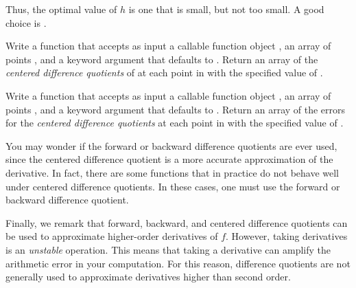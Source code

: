 Thus, the optimal value of $h$ is one that is small, but not too small. A good choice is .

\begin{problem}
Write a function that accepts as input a callable function object , an array of points , and
a keyword argument  that defaults to . 
Return an array of the \emph{centered difference quotients} of  at each point in  with the specified value of .
\end{problem}
\begin{problem}
Write a function that accepts as input a callable function object , an array of points , and
a keyword argument  that defaults to .  Return an array of the errors for the \emph{centered difference quotients} at each point in  with the specified value of .
\end{problem}

You may wonder if the forward or backward difference quotients are ever used, since the centered difference quotient is a more accurate approximation of the derivative.
In fact, there are some functions that in practice do not behave well under centered difference quotients.
In these cases, one must use the forward or backward difference quotient.


Finally, we remark that forward, backward, and centered difference quotients can be used to approximate higher-order derivatives of $f$.
However, taking derivatives is an \emph{unstable} operation. 
This means that taking a derivative can amplify the arithmetic error in your computation.
For this reason, difference quotients are not generally used  to approximate derivatives higher than second order.





